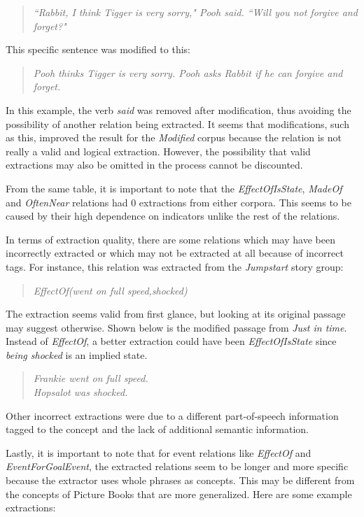 \begin{verse}
\itshape
``Rabbit, I think Tigger is very sorry," Pooh said. ``Will you not forgive and forget?"
\end{verse}

This specific sentence was modified to this:

\begin{verse}
\itshape
Pooh thinks Tigger is very sorry. Pooh asks Rabbit if he can forgive and forget.
\end{verse}

In this example, the verb \textit{said} was removed after modification, thus avoiding the possibility of another relation being extracted. It seems that modifications, such as this, improved the result for the \textit{Modified} corpus because the relation is not really a valid and logical extraction. However, the possibility that valid extractions may also be omitted in the process cannot be discounted.

From the same table, it is important to note that the \textit{EffectOfIsState}, \textit{MadeOf} and \textit{OftenNear} relations had 0 extractions from either corpora. This seems to be caused by their high dependence on indicators unlike the rest of the relations.

In terms of extraction quality, there are some relations which may have been incorrectly extracted or which may not be extracted at all because of incorrect tags. For instance, this relation was extracted from the \textit{Jumpstart} story group:

\begin{verse}
\itshape
EffectOf(went on full speed,shocked)
\end{verse}

The extraction seems valid from first glance, but looking at its original passage may suggest otherwise. Shown below is the modified passage from \textit{Just in time}. Instead of \textit{EffectOf}, a better extraction could have been \textit{EffectOfIsState} since \textit{being shocked} is an implied state. 

\begin{verse}
\itshape
Frankie went on full speed.\\
Hopsalot was shocked.
\end{verse}

Other incorrect extractions were due to a different part-of-speech information tagged to the concept and the lack of additional semantic information.

Lastly, it is important to note that for event relations like \textit{EffectOf} and \textit{EventForGoalEvent}, the extracted relations seem to be longer and more specific because the extractor uses whole phrases as concepts. This may be different from the concepts of Picture Books that are more generalized. Here are some example extractions:

